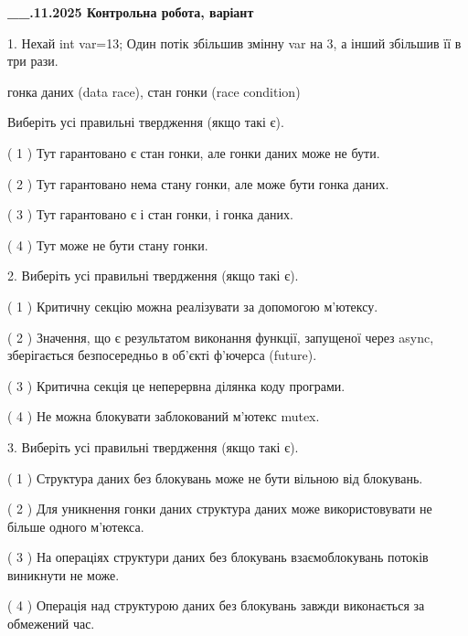 \documentclass[12pt, ukrainian]{article}
\begin{document}
\newpage
\begin {large}

\textbf{\_\_.11.2025 Контрольна робота, варіант  }\par


{
1. Нехай int var=13; Один потік збільшив змінну var на 3, а інший збільшив її в три рази.

гонка даних (data race), стан гонки (race condition)

Виберіть усі правильні твердження (якщо такі є).\par
\vspace{2mm}
( 1 ) Тут гарантовано є стан гонки, але гонки даних може не бути.%

( 2 ) Тут гарантовано нема стану гонки, але може бути гонка даних.%

( 3 ) Тут гарантовано є і стан гонки, і гонка даних.%

( 4 ) Тут може не бути стану гонки.%


2. Виберіть усі правильні твердження (якщо такі є).\par
\vspace{2mm}

( 1 ) Критичну секцію можна реалізувати за допомогою м’ютексу.%

( 2 ) Значення, що є результатом виконання функції, запущеної через async, зберігається безпосередньо в об’єкті ф’ючерса (future).%

( 3 ) Критична секція це неперервна ділянка коду програми.%

( 4 ) Не можна блокувати заблокований м’ютекс mutex.%


3. Виберіть усі правильні твердження (якщо такі є).\par
\vspace{2mm}

( 1 ) Структура даних без блокувань може не бути вільною від блокувань.%

( 2 ) Для уникнення гонки даних структура даних може використовувати не більше одного м’ютекса.%

( 3 ) На операціях структури даних без блокувань взаємоблокувань потоків виникнути не може.%

( 4 ) Операція над структурою даних без блокувань завжди виконається за обмежений час.%


}
\end{large}
\end{document}
